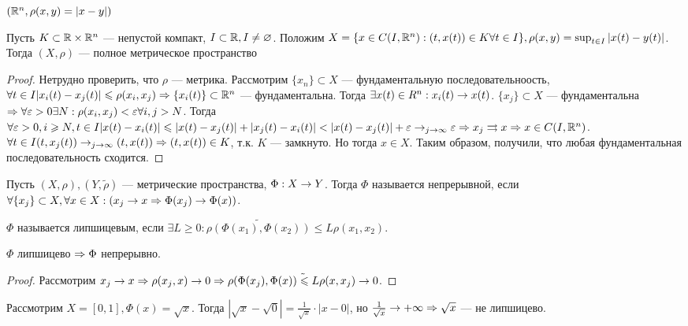 \begin{example}
	\((\mathbb{R}^n, \rho(x, y) = |x - y|)\)
\end{example}

\begin{example}
	Пусть \(K \subset \mathbb{R} \times \mathbb{R}^n\) --- непустой компакт, \(I \subset \mathbb{R}, I \ne \varnothing\). Положим \(X = \{x \in C(I, \mathbb{R}^n): (t, x(t)) \in K \forall t \in I\}, \rho(x, y) = \sup_{t \in I}|x(t) - y(t)|\). Тогда \((X, \rho)\) --- полное метрическое пространство
\end{example}
\begin{proof}
	Нетрудно проверить, что \(\rho\) --- метрика. Рассмотрим \(\{x_n\} \subset X\) --- фундаментальную последовательноость, \(\forall t \in I |x_i(t) - x_j(t)| \leqslant \rho(x_i, x_j) \Rightarrow \{x_i(t)\} \subset \mathbb{R}^n\) --- фундаментальна. Тогда \(\exists x(t) \in R^n: x_i(t) \rightarrow x(t)\). \(\{x_j\} \subset X\) --- фундаментальна \(\Rightarrow \forall \varepsilon > 0 \exists N: \rho(x_i, x_j) < \varepsilon \forall i, j > N\). Тогда \(\forall \varepsilon > 0, i \geqslant N, t \in I |x(t) - x_i(t)| \leqslant |x(t) - x_j(t)| + |x_j(t) - x_i(t)| < |x(t) - x_j(t)| + \varepsilon \rightarrow_{j \rightarrow \infty} \varepsilon \Rightarrow x_j \rightrightarrows x \Rightarrow x \in C(I, \mathbb{R}^n)\). \(\forall t \in I (t, x_j(t)) \rightarrow_{j \rightarrow \infty} (t, x(t)) \Rightarrow (t, x(t)) \in K\), т.к. \(K\) --- замкнуто. Но тогда \(x \in X\). Таким образом, получили, что любая фундаментальная последовательность сходится.
\end{proof}

\begin{definition}
	Пусть \((X, \rho), (Y, \tilde{\rho})\) --- метрические пространства, \(\Phi: X \rightarrow Y\). Тогда \(\Phi\) называется непрерывной, если \(\forall \{x_j\} \subset X, \forall x \in X: (x_j \rightarrow x \Rightarrow \Phi(x_j) \rightarrow \Phi(x))\).
\end{definition}

\begin{definition}
	\(\Phi\) называется липшицевым, если \(\exists L \ge 0: \tilde{\rho(\Phi(x_1), \Phi(x_2))} \le L \rho(x_1, x_2)\).
\end{definition}

\begin{proposition}
	\(\Phi\) липшицево \(\Rightarrow \Phi\) непрерывно.
\end{proposition}
\begin{proof}
	Рассмотрим \(x_j \rightarrow x \Rightarrow \rho(x_j, x) \rightarrow 0 \Rightarrow \tilde{\rho(\Phi(x_j), \Phi(x)) \leqslant L\rho(x, x_j) \rightarrow 0}\).
\end{proof}

\begin{example}
	Рассмотрим \(X = [0, 1], \Phi(x) = \sqrt{x}\). Тогда \(|\sqrt{x} - \sqrt{0}| = \frac{1}{\sqrt{x}}\cdot |x - 0|\), но \(\frac{1}{\sqrt{x}} \rightarrow +\infty \Rightarrow \sqrt{x}\) --- не липшицево.
\end{example}

